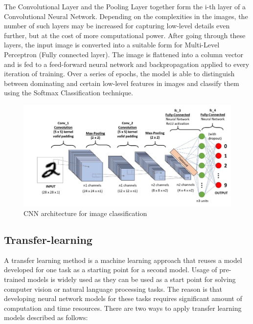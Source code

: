     The Convolutional Layer and the Pooling Layer together form the i-th layer of a Convolutional Neural Network. Depending on the complexities in the images, the number of such layers may be increased for capturing low-level details even further, but at the cost of more computational power. 
    After going through these layers, the input image is converted into a suitable form for Multi-Level Perceptron (Fully connected layer). The image is flattened into a column vector and  is fed to a feed-forward neural network and backpropagation applied to every iteration of training. Over a series of epochs, the model is able to distinguish between dominating and certain low-level features in images and classify them using the Softmax Classification technique.
      \begin{figure}[h]
      	\centering
      	\includegraphics[width=1\linewidth]{images/cnn.png}
      	\caption{CNN architecture for image classification \cite{imgcnn}}
      	\label{l00}	
      \end{figure}
    
    \subsection{Transfer-learning}
    A transfer learning method is a machine learning approach that reuses a model developed for one task as a starting point for a second model. Usage of pre-trained models is widely used as they can be used as a start point for solving computer vision or natural language processing tasks. The reason is that developing neural network models for these tasks requires significant amount of computation and time resources. There are two ways to apply transfer learning models described as follows:
    
